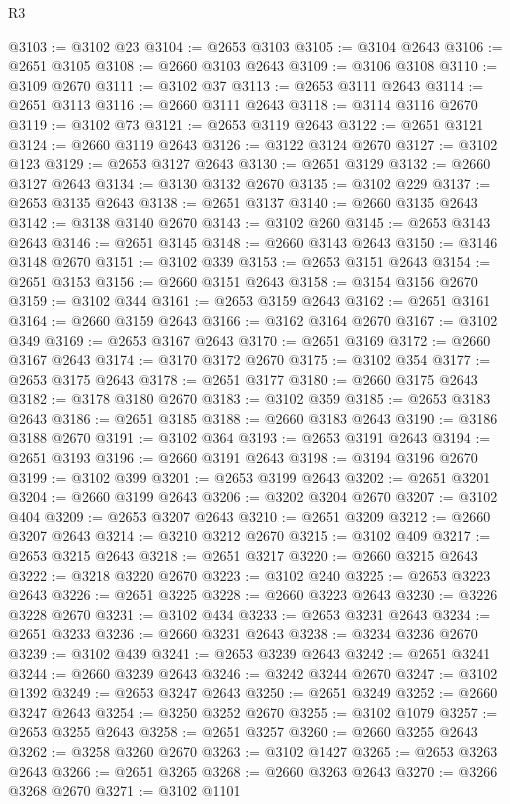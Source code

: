 \begin{lexlean}{R3}
\begin{coremodule}
@3103 := @3102 @23
@3104 := @2653 @3103
@3105 := @3104 @2643
@3106 := @2651 @3105
@3108 := @2660 @3103 @2643
@3109 := @3106 @3108
@3110 := @3109 @2670
@3111 := @3102 @37
@3113 := @2653 @3111 @2643
@3114 := @2651 @3113
@3116 := @2660 @3111 @2643
@3118 := @3114 @3116 @2670
@3119 := @3102 @73
@3121 := @2653 @3119 @2643
@3122 := @2651 @3121
@3124 := @2660 @3119 @2643
@3126 := @3122 @3124 @2670
@3127 := @3102 @123
@3129 := @2653 @3127 @2643
@3130 := @2651 @3129
@3132 := @2660 @3127 @2643
@3134 := @3130 @3132 @2670
@3135 := @3102 @229
@3137 := @2653 @3135 @2643
@3138 := @2651 @3137
@3140 := @2660 @3135 @2643
@3142 := @3138 @3140 @2670
@3143 := @3102 @260
@3145 := @2653 @3143 @2643
@3146 := @2651 @3145
@3148 := @2660 @3143 @2643
@3150 := @3146 @3148 @2670
@3151 := @3102 @339
@3153 := @2653 @3151 @2643
@3154 := @2651 @3153
@3156 := @2660 @3151 @2643
@3158 := @3154 @3156 @2670
@3159 := @3102 @344
@3161 := @2653 @3159 @2643
@3162 := @2651 @3161
@3164 := @2660 @3159 @2643
@3166 := @3162 @3164 @2670
@3167 := @3102 @349
@3169 := @2653 @3167 @2643
@3170 := @2651 @3169
@3172 := @2660 @3167 @2643
@3174 := @3170 @3172 @2670
@3175 := @3102 @354
@3177 := @2653 @3175 @2643
@3178 := @2651 @3177
@3180 := @2660 @3175 @2643
@3182 := @3178 @3180 @2670
@3183 := @3102 @359
@3185 := @2653 @3183 @2643
@3186 := @2651 @3185
@3188 := @2660 @3183 @2643
@3190 := @3186 @3188 @2670
@3191 := @3102 @364
@3193 := @2653 @3191 @2643
@3194 := @2651 @3193
@3196 := @2660 @3191 @2643
@3198 := @3194 @3196 @2670
@3199 := @3102 @399
@3201 := @2653 @3199 @2643
@3202 := @2651 @3201
@3204 := @2660 @3199 @2643
@3206 := @3202 @3204 @2670
@3207 := @3102 @404
@3209 := @2653 @3207 @2643
@3210 := @2651 @3209
@3212 := @2660 @3207 @2643
@3214 := @3210 @3212 @2670
@3215 := @3102 @409
@3217 := @2653 @3215 @2643
@3218 := @2651 @3217
@3220 := @2660 @3215 @2643
@3222 := @3218 @3220 @2670
@3223 := @3102 @240
@3225 := @2653 @3223 @2643
@3226 := @2651 @3225
@3228 := @2660 @3223 @2643
@3230 := @3226 @3228 @2670
@3231 := @3102 @434
@3233 := @2653 @3231 @2643
@3234 := @2651 @3233
@3236 := @2660 @3231 @2643
@3238 := @3234 @3236 @2670
@3239 := @3102 @439
@3241 := @2653 @3239 @2643
@3242 := @2651 @3241
@3244 := @2660 @3239 @2643
@3246 := @3242 @3244 @2670
@3247 := @3102 @1392
@3249 := @2653 @3247 @2643
@3250 := @2651 @3249
@3252 := @2660 @3247 @2643
@3254 := @3250 @3252 @2670
@3255 := @3102 @1079
@3257 := @2653 @3255 @2643
@3258 := @2651 @3257
@3260 := @2660 @3255 @2643
@3262 := @3258 @3260 @2670
@3263 := @3102 @1427
@3265 := @2653 @3263 @2643
@3266 := @2651 @3265
@3268 := @2660 @3263 @2643
@3270 := @3266 @3268 @2670
@3271 := @3102 @1101

\end{coremodule}
\end{lexlean}
